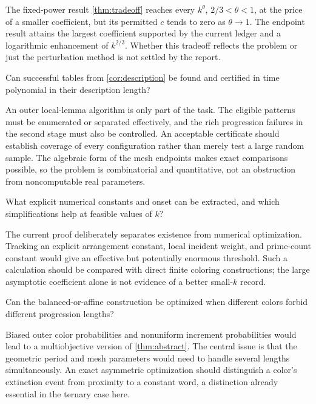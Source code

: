 The fixed-power result \cref{thm:tradeoff} reaches every
\(k^\theta\), \(2/3<\theta<1\), at the price of a smaller coefficient,
but its permitted \(c\) tends to zero as \(\theta\to1\).
The endpoint result attains the largest coefficient supported by the
current ledger and a logarithmic enhancement of \(k^{2/3}\).
Whether this tradeoff reflects the problem or just the perturbation
method is not settled by the report.

\begin{question}\label{q:algorithm}
Can successful tables from \cref{cor:description} be found and
certified in time polynomial in their description length?
\end{question}

An outer local-lemma algorithm is only part of the task.
The eligible patterns must be enumerated or separated effectively,
and the rich progression failures in the second stage must also be
controlled.
An acceptable certificate should establish coverage of every
configuration rather than merely test a large random sample.
The algebraic form of the mesh endpoints makes exact comparisons
possible, so the problem is combinatorial and quantitative, not an
obstruction from noncomputable real parameters.

\begin{question}\label{q:onset}
What explicit numerical constants and onset can be extracted, and
which simplifications help at feasible values of \(k\)?
\end{question}

The current proof deliberately separates existence from numerical
optimization. Tracking an explicit arrangement constant, local
incident weight, and prime-count constant would give an effective
but potentially enormous threshold.
Such a calculation should be compared with direct finite coloring
constructions; the large asymptotic coefficient alone is not evidence
of a better small-\(k\) record.

\begin{question}\label{q:offdiag}
Can the balanced-or-affine construction be optimized when different
colors forbid different progression lengths?
\end{question}

Biased outer color probabilities and nonuniform increment probabilities
would lead to a multiobjective version of
\cref{thm:abstract}.
The central issue is that the geometric period and mesh parameters
would need to handle several lengths simultaneously.
An exact asymmetric optimization should distinguish a color's
extinction event from proximity to a constant word, a distinction
already essential in the ternary case here.

